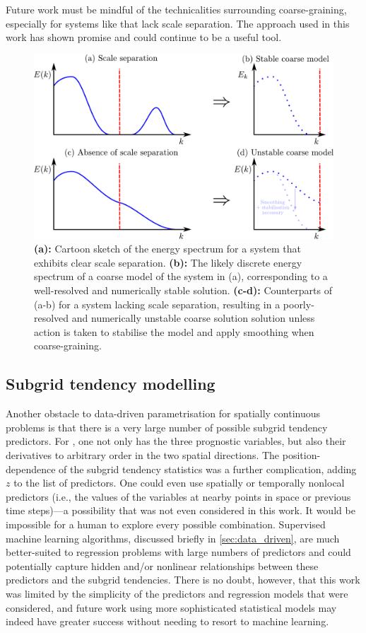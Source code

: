 \documentclass[../main.tex]{subfiles}
\begin{document}
Future work must be mindful of the technicalities surrounding coarse-graining,
especially for systems like \rb{} that lack scale separation. The approach
used in this work has shown promise and could continue to be a useful tool.

\begin{figure}[ht]
    \centering
    \includegraphics[width=0.7\linewidth]{figures/scale_separation.pdf}
    \caption{
        \textbf{(a):} Cartoon sketch of the energy spectrum for a system that
        exhibits clear scale separation. \textbf{(b):} The likely discrete
        energy spectrum of a coarse model of the system in (a), corresponding
        to a well-resolved and numerically stable solution. \textbf{(c-d):}
        Counterparts of (a-b) for a system lacking scale separation,
        resulting in a poorly-resolved and numerically unstable coarse solution
        solution unless action is taken to stabilise the model and apply
        smoothing when coarse-graining.
    }
    \label{fig:scale_separation}
\end{figure}


\subsection{Subgrid tendency modelling}
Another obstacle to data-driven parametrisation for spatially continuous
problems is that there is a very large number of possible subgrid tendency
predictors. For \rb{}, one not only has the three prognostic variables, but
also their derivatives to arbitrary order in the two spatial directions. The
position-dependence of the subgrid tendency statistics was a further
complication, adding $z$ to the list of predictors. One could even use
spatially or temporally nonlocal predictors (i.e., the values of the variables
at nearby points in space or previous time steps)---a possibility that was not
even considered in this work. It would be impossible for a human to explore
every possible combination. Supervised machine learning algorithms, discussed
briefly in \cref{sec:data_driven}, are much better-suited to regression
problems with large numbers of predictors and could potentially capture hidden
and/or nonlinear relationships between these predictors and the subgrid
tendencies. There is no doubt, however, that this work was limited by the
simplicity of the predictors and regression models that were considered, and
future work using more sophisticated statistical models may indeed have greater
success without needing to resort to machine learning.
\end{document}

